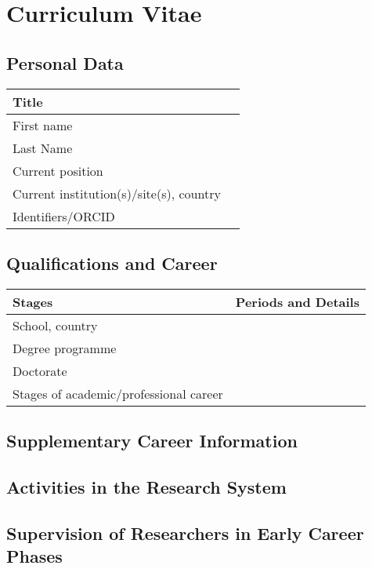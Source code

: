 \documentclass[english, 53.200]{proposal}
\begin{document}
\section*{Curriculum Vitae}

\subsection*{Personal Data}

\begin{tabular}{|>{\raggedright}p{}|p{}|}
\hline
Title & \\
\hline
First name & \\
\hline
Last Name & \\
\hline
Current position &  \\
\hline
Current institution(s)/site(s), country & \\
\hline
Identifiers/ORCID & \\
\hline
\end{tabular}

\subsection*{Qualifications and Career}

\begin{tabular}{|>{\raggedright}p{}|p{}|}
\hline
\textbf{Stages} & \textbf{Periods and Details} \\
\hline
School, country & \\ %
\hline
Degree programme & \\
\hline
Doctorate & \\
\hline
Stages of academic/professional career & \\ %
\hline
\end{tabular}

\subsection*{Supplementary Career Information}

\subsection*{Activities in the Research System}

\subsection*{Supervision of Researchers in Early Career Phases}
\end{document}
